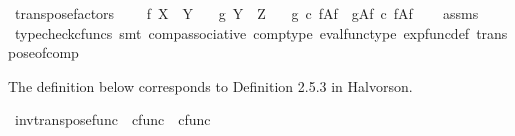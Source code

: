 \begin{isabellebody}
\endisatagproof
{\isafoldproof}%
%
\isadelimproof
\isanewline
%
\endisadelimproof
\isanewline
{}\isamarkupfalse%
\ transpose{\isacharunderscore}{\kern0pt}factors{\isacharcolon}{\kern0pt}\ \isanewline
\ \ \ {\isachardoublequoteopen}f{\isacharcolon}{\kern0pt}\ X\ {\isasymrightarrow}\ Y{\isachardoublequoteclose}\isanewline
\ \ \ {\isachardoublequoteopen}g{\isacharcolon}{\kern0pt}\ Y\ {\isasymrightarrow}\ Z{\isachardoublequoteclose}\isanewline
\ \ \ {\isachardoublequoteopen}{\isacharparenleft}{\kern0pt}g\ {\isasymcirc}\isactrlsub c\ f{\isacharparenright}{\kern0pt}\isactrlbsup A\isactrlesup \isactrlsub f\ {\isacharequal}{\kern0pt}\ {\isacharparenleft}{\kern0pt}g\isactrlbsup A\isactrlesup \isactrlsub f{\isacharparenright}{\kern0pt}\ {\isasymcirc}\isactrlsub c\ {\isacharparenleft}{\kern0pt}f\isactrlbsup A\isactrlesup \isactrlsub f{\isacharparenright}{\kern0pt}{\isachardoublequoteclose}\isanewline
%
\isadelimproof
\ \ %
\endisadelimproof
%
\isatagproof
{}\isamarkupfalse%
\ assms\ \isamarkupfalse%
\ {\isacharparenleft}{\kern0pt}typecheck{\isacharunderscore}{\kern0pt}cfuncs{\isacharcomma}{\kern0pt}\ smt\ comp{\isacharunderscore}{\kern0pt}associative{}\ comp{\isacharunderscore}{\kern0pt}type\ eval{\isacharunderscore}{\kern0pt}func{\isacharunderscore}{\kern0pt}type\ exp{\isacharunderscore}{\kern0pt}func{\isacharunderscore}{\kern0pt}def{}\ transpose{\isacharunderscore}{\kern0pt}of{\isacharunderscore}{\kern0pt}comp{\isacharparenright}{\kern0pt}%
\endisatagproof
{\isafoldproof}%
%
\isadelimproof
%
\endisadelimproof
%
\isadelimdocument
%
\endisadelimdocument
%
\isatagdocument
%
\isamarkuptrue%
%
\endisatagdocument
{\isafolddocument}%
%
\isadelimdocument
%
\endisadelimdocument
%
\begin{isamarkuptext}%
The definition below corresponds to Definition 2.5.3 in Halvorson.%
\end{isamarkuptext}\isamarkuptrue%
\isamarkupfalse%
\ inv{\isacharunderscore}{\kern0pt}transpose{\isacharunderscore}{\kern0pt}func\ {\isacharcolon}{\kern0pt}{\isacharcolon}{\kern0pt}\ {\isachardoublequoteopen}cfunc\ {\isasymRightarrow}\ cfunc{\isachardoublequoteclose}\ {\isacharparenleft}{\kern0pt}{\isachardoublequoteopen}{\isacharunderscore}{\kern0pt}\isactrlsup {\isasymflat}{\isachardoublequoteclose}\ {\isacharbrackleft}{\kern0pt}{}{}{}{\isacharbrackright}{\kern0pt}{}{}{}{\isacharparenright}{\kern0pt}\ \isanewline

\end{isabellebody}
